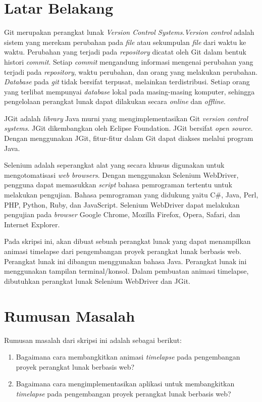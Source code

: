 \documentclass[a4paper,twoside]{article}
\begin{document}
\section{Latar Belakang}
Git merupakan perangkat lunak \textit{Version Control Systems}\cite{chacon2014pro}.\textit{Version control} adalah sistem yang merekam perubahan pada \textit{file} atau sekumpulan \textit{file} dari waktu ke waktu. Perubahan yang terjadi pada \textit{repository} dicatat oleh Git dalam bentuk histori \textit{commit}. Setiap \textit{commit} mengandung informasi mengenai perubahan yang terjadi pada \textit{repository}, waktu perubahan, dan orang yang melakukan perubahan. \textit{Database} pada \textit{git} tidak bersifat terpusat, melainkan terdistribusi. Setiap orang yang terlibat mempunyai \textit{database} lokal pada masing-masing komputer, sehingga pengelolaan perangkat lunak dapat dilakukan secara \textit{online} dan \textit{offline}.

JGit adalah \textit{library} Java murni yang mengimplementasikan Git \textit{version control systems}\cite{JGit}. JGit dikembangkan oleh Eclipse Foundation. JGit bersifat \textit{open source}. Dengan menggunakan JGit, fitur-fitur dalam Git dapat diakses melalui program Java. 

Selenium adalah seperangkat alat yang secara khusus digunakan untuk mengotomatisasi \textit{web browsers}\cite{Selenium}. Dengan menggunakan Selenium WebDriver, pengguna dapat memasukkan \textit{script} bahasa pemrograman tertentu untuk melakukan pengujian. Bahasa pemrograman yang didukung yaitu C\#, Java, Perl, PHP, Python, Ruby, dan JavaScript. Selenium WebDriver dapat melakukan pengujian pada \textit{browser} Google Chrome, Mozilla Firefox, Opera, Safari, dan Internet Explorer.  
  
Pada skripsi ini, akan dibuat sebuah perangkat lunak yang dapat menampilkan animasi timelapse dari pengembangan proyek perangkat lunak berbasis web. Perangkat lunak ini dibangun menggunakan bahasa Java. Perangkat lunak ini menggunakan tampilan terminal/konsol. Dalam pembuatan animasi timelapse, dibutuhkan perangkat lunak Selenium WebDriver dan JGit.


\section{Rumusan Masalah}
Rumusan masalah dari skripsi ini adalah sebagai berikut:
\begin{enumerate}
	\item Bagaimana cara membangkitkan animasi \textit{timelapse} pada pengembangan proyek perangkat lunak berbasis web?
	\item Bagaimana cara mengimplementasikan aplikasi untuk membangkitkan \textit{timelapse} pada pengembangan proyek perangkat lunak berbasis web?
\end{enumerate}
\end{document}
